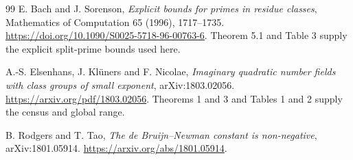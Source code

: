 \begin{thebibliography}{99}
E. Bach and J. Sorenson, \emph{Explicit bounds for primes in residue
classes}, Mathematics of Computation 65 (1996), 1717--1735.
\url{https://doi.org/10.1090/S0025-5718-96-00763-6}.
Theorem 5.1 and Table 3 supply the explicit split-prime bounds used here.

A.-S. Elsenhans, J. Kl\"uners and F. Nicolae,
\emph{Imaginary quadratic number fields with class groups of small
exponent}, arXiv:1803.02056.
\url{https://arxiv.org/pdf/1803.02056}.
Theorems 1 and 3 and Tables 1 and 2 supply the census and global range.

B. Rodgers and T. Tao, \emph{The de Bruijn--Newman constant is
non-negative}, arXiv:1801.05914.
\url{https://arxiv.org/abs/1801.05914}.

\end{thebibliography}

